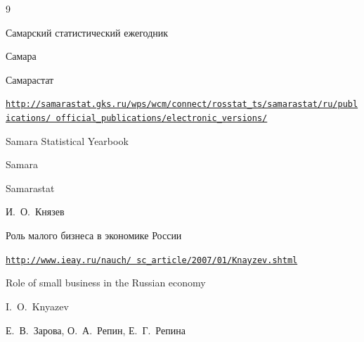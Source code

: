 \begin{thebibliography}{9}









\book Самарский статистический ежегодник

\publaddr Самара

\publ Самарастат



\elink 

\href{http://samarastat.gks.ru/wps/wcm/connect/rosstat_ts/samarastat/ru/publications/official_publications/electronic_versions/}{\tt http://samarastat.gks.ru/wps/wcm/connect/rosstat\_ts/samarastat/ru/publications/ official\_publications/electronic\_versions/}

\misctransl

\book Samara Statistical Yearbook

\publaddr Samara

\publ Samarastat















\by И.~О.~Князев

\eprint Роль малого бизнеса в экономике России

\elink \href{http://www.ieay.ru/nauch/sc_article/2007/01/Knayzev.shtml}{\tt http://www.ieay.ru/nauch/ sc\_article/2007/01/Knayzev.shtml}

\misctransl

\eprint Role of small business in the Russian economy

\by I.~O.~Knyazev






\by Е.~В.~Зарова, О.~А.~Репин,  Е.~Г.~Репина


\end{thebibliography}

